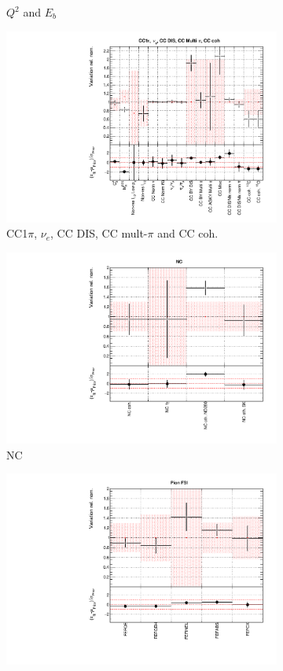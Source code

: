 \begin{figure}[!htbp]
\begin{subfigure}{0.49\textwidth}
  \caption{$Q^2$ and $E_b$}
\end{subfigure}
\begin{subfigure}{0.49\textwidth}
  \centering
  \includegraphics[width=0.9\linewidth]{figs/datxsec3}
  \caption{CC1$\pi$, $\nu_e$, CC DIS, CC mult-$\pi$ and CC coh.}
\end{subfigure}
\begin{subfigure}{0.45\textwidth}
  \centering
  \includegraphics[width=0.9\linewidth]{figs/datxsec4}
  \caption{NC}
\end{subfigure}
\begin{subfigure}{0.49\textwidth}
  \centering
  \includegraphics[width=0.9\linewidth]{figs/datxsec5}

\end{subfigure}
\end{figure}
